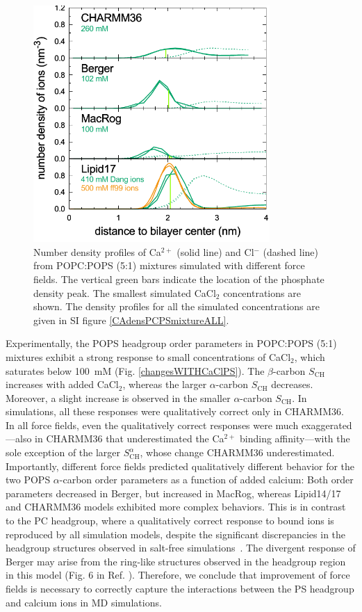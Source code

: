\documentclass[journal=jpcbfk,manuscript=article]{achemso}
\begin{document}
\begin{figure}[tb]
  \centering
  \includegraphics[width=9cm]{../Figs/CAdensPCPSmixtureLOWconsformatted.pdf}
  \caption{\label{CAdensPCPSmixture}
    Number density profiles of Ca$^{2+}$ (solid line) and Cl$^-$ (dashed line) from POPC:POPS (5:1) mixtures
    simulated with different force fields. The vertical green bars indicate the location of the phosphate density peak.
    The smallest simulated CaCl$_2$ concentrations are shown.
    The density profiles for all the simulated concentrations are given in SI figure \ref{CAdensPCPSmixtureALL}.
  }
\end{figure}


Experimentally, the POPS headgroup order parameters in POPC:POPS (5:1) mixtures
exhibit a strong response to small concentrations of CaCl$_2$, which saturates below 100~mM (Fig. \ref{changesWITHCaClPS}).
The $\beta$-carbon $S_\mathrm{CH}$ increases with added CaCl$_2$,
whereas the larger $\alpha$-carbon $S_\mathrm{CH}$ decreases. Moreover, a slight increase is observed in
the smaller $\alpha$-carbon $S_\mathrm{CH}$.
In simulations, all these responses were qualitatively correct only in CHARMM36.
In all force fields, even the qualitatively correct responses were much exaggerated---also in CHARMM36 that underestimated the Ca$^{2+}$ binding affinity---with
the sole exception of the larger $S^\alpha_\mathrm{CH}$, whose change CHARMM36 underestimated.
Importantly, different force fields predicted qualitatively different behavior
for the two POPS $\alpha$-carbon order parameters as a function of added calcium:
Both order parameters decreased in Berger, but increased
in MacRog, whereas Lipid14/17 and CHARMM36 models exhibited more complex behaviors.
This is in contrast to the PC headgroup, where a
qualitatively correct response to bound ions is reproduced
by all simulation models, despite the significant discrepancies in the headgroup
structures observed in salt-free simulations~\cite{catte16}.
The divergent response of Berger may arise from the ring-like structures
observed in the headgroup region in this model (Fig. 6 in Ref. ).
Therefore, we conclude that
improvement of force fields is necessary to correctly capture the interactions between the
PS headgroup and calcium ions in MD simulations.
\end{document}
